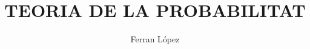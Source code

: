 \documentclass[catalan]{../notes}
\title{TEORIA DE LA PROBABILITAT}
\author{Ferran López}\singleauthor
\begin{document}
\makecover





\printindex
\end{document}
